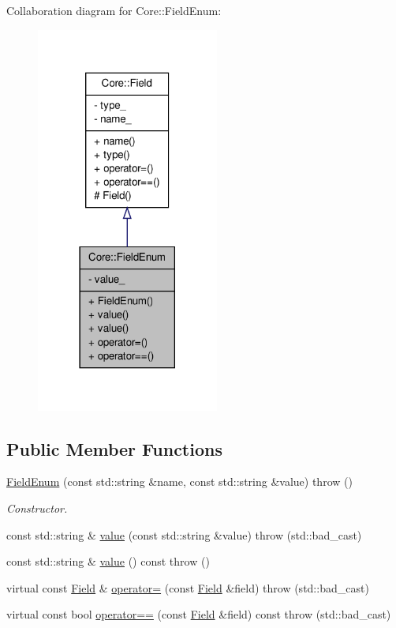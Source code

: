 Collaboration diagram for Core::FieldEnum:
\nopagebreak
\begin{figure}[H]
\begin{center}
\leavevmode
\includegraphics[width=170pt]{d6/db1/classCore_1_1FieldEnum__coll__graph}
\end{center}
\end{figure}
\subsection*{Public Member Functions}
\begin{DoxyCompactItemize}
\item 
\hyperlink{classCore_1_1FieldEnum_acd36404569789f33d1fbbbc7580dee98}{FieldEnum} (const std::string \&name, const std::string \&value)  throw ()
\begin{DoxyCompactList}\small\item\em Constructor. \item\end{DoxyCompactList}\item 
const std::string \& \hyperlink{classCore_1_1FieldEnum_a50d449354fbca83fc51c2feb1d06bb9e}{value} (const std::string \&value)  throw (std::bad\_\-cast)
\item 
const std::string \& \hyperlink{classCore_1_1FieldEnum_af10b8aa54cc84acda18cbf85614e26f2}{value} () const   throw ()
\item 
virtual const \hyperlink{classCore_1_1Field}{Field} \& \hyperlink{classCore_1_1FieldEnum_ab0e6e56ee028b5ba08e47edb14d76be1}{operator=} (const \hyperlink{classCore_1_1Field}{Field} \&field)  throw (std::bad\_\-cast)
\item 
virtual const bool \hyperlink{classCore_1_1FieldEnum_a49097e37b11fb74375e89f365aee9c31}{operator==} (const \hyperlink{classCore_1_1Field}{Field} \&field) const   throw (std::bad\_\-cast)
\end{DoxyCompactItemize}


